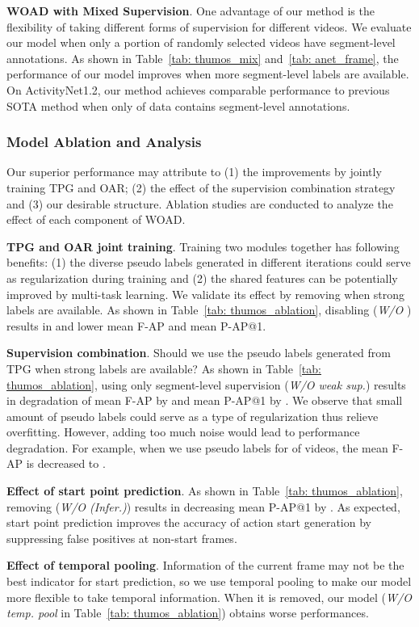 \documentclass[final]{cvpr}
\begin{document}
\textbf{WOAD with Mixed Supervision}. One advantage of our method is the flexibility of taking different forms of supervision for different videos. We evaluate our model when only a portion of randomly selected videos have segment-level annotations. As shown in Table~\ref{tab: thumos_mix} and~\ref{tab: anet_frame}, the performance of our model improves when more segment-level labels are available. On ActivityNet1.2, our method achieves comparable performance to previous SOTA method when only  of data contains segment-level annotations.

\subsubsection{Model Ablation and Analysis}
\label{sec: ablation}
Our superior performance may attribute to (1) the improvements by jointly training TPG and OAR; (2) the effect of the supervision combination strategy and (3) our desirable structure. Ablation studies are conducted to analyze the effect of each component of WOAD. 

\textbf{TPG and OAR joint training}. Training two modules together has following benefits: (1) the diverse pseudo labels generated in different iterations could serve as regularization during training and (2) the shared features can be potentially improved by multi-task learning. We validate its effect by removing  when strong labels are available. As shown in Table~\ref{tab: thumos_ablation}, disabling  (\emph{W/O }) results in  and  lower mean F-AP and mean P-AP@1. 

\textbf{Supervision combination}. Should we use the pseudo labels generated from TPG when strong labels are available? As shown in Table~\ref{tab: thumos_ablation}, using only segment-level supervision (\emph{W/O weak sup.}) results in degradation of mean F-AP by  and mean P-AP@1 by . We observe that small amount of pseudo labels could serve as a type of regularization thus relieve overfitting. However, adding too much noise would lead to performance degradation. For example, when we use pseudo labels for  of videos, the mean F-AP is decreased to .

\textbf{Effect of start point prediction}. As shown in Table~\ref{tab: thumos_ablation}, removing  (\emph{W/O  (Infer.)}) results in decreasing mean P-AP@1 by . As expected, start point prediction improves the accuracy of action start generation by suppressing false positives at non-start frames. 

\textbf{Effect of temporal pooling}. Information of the current frame may not be the best indicator for start prediction, so we use temporal pooling to make our model more flexible to take temporal information. When it is removed, our model (\emph{W/O temp. pool} in Table~\ref{tab: thumos_ablation}) obtains worse performances. 
\end{document}
